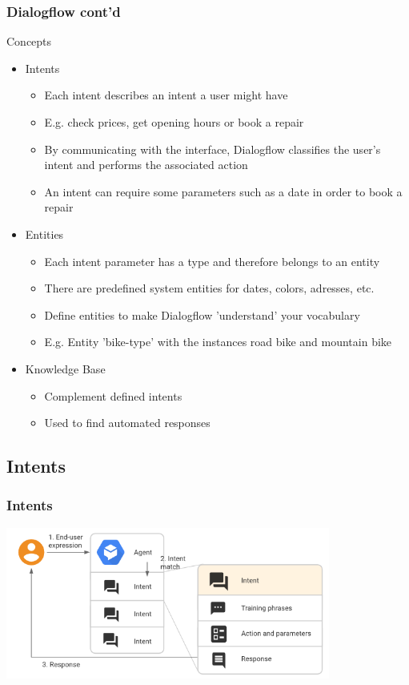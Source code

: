 \documentclass{beamer}
\begin{document}
\begin{frame}
\frametitle{Dialogflow cont'd}
\begin{block}{Concepts}
\begin{itemize}
\item Intents
\begin{itemize}
\item Each intent describes an intent a user might have
\item E.g. check prices, get opening hours or book a repair
\item By communicating with the interface, Dialogflow classifies the user's intent and performs the associated action
\item An intent can require some parameters such as a date in order to book a repair
\end{itemize}
\item Entities
\begin{itemize}
\item Each intent parameter has a type and therefore belongs to an entity
\item There are predefined system entities for dates, colors, adresses, etc.
\item Define entities to make Dialogflow 'understand' your vocabulary
\item E.g. Entity 'bike-type' with the instances road bike and mountain bike
\end{itemize}
\item Knowledge Base
\begin{itemize}
\item Complement defined intents
\item Used to find automated responses
\end{itemize}
\end{itemize}
\end{block}
\end{frame}



\subsection{Intents}

\begin{frame}
\frametitle{Intents}
\begin{center}
\includegraphics[width=0.8\textwidth]{pictures/intent.png}

\end{center}
\end{frame}
\end{document}
